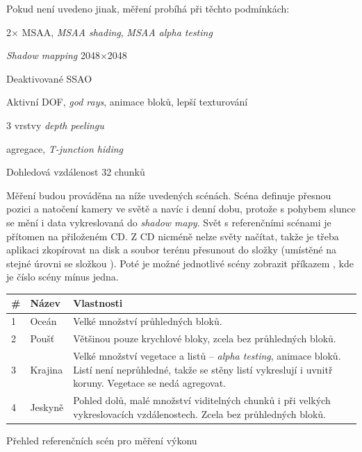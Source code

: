 \noindent Pokud není uvedeno jinak, měření probíhá při těchto podmínkách:
\begin{compactitem}
	\item 2× MSAA, \textit{MSAA shading}, \textit{MSAA alpha testing}
	\item \textit{Shadow mapping} 2048×2048
	\item Deaktivované SSAO
	\item Aktivní DOF, \textit{god rays}, animace bloků, lepší texturování
	\item 3 vrstvy \textit{depth peelingu}
	\item {} agregace, \textit{T-junction hiding}
	\item Dohledová vzdálenost 32 chunků
\end{compactitem}
\vspace{3mm}

\noindent Měření budou prováděna na níže uvedených scénách. Scéna definuje přesnou pozici a natočení kamery ve světě a navíc i denní dobu, protože s pohybem slunce se mění i data vykreslovaná do \textit{shadow mapy}. Svět s referenčními scénami je přítomen na přiloženém CD. Z CD nicméně nelze světy načítat, takže je třeba aplikaci zkopírovat na disk a soubor terénu  přesunout do složky  (umístěné na stejné úrovni se složkou ). Poté je možné jednotlivé scény zobrazit příkazem , kde  je číslo scény mínus jedna.

\begin{tableFloat}[H]
	\centering
	\def\arraystretch{1.5}
	\begin{tabular}{l l L{12cm}}
		\textbf{\#} & \textbf{Název} & \textbf{Vlastnosti} \\  & Oceán & Velké množství průhledných bloků. \\
		2 & Poušť & Většinou pouze krychlové bloky, zcela bez průhledných bloků. \\
		3 & Krajina & Velké množství vegetace a listů -- \textit{alpha testing}, animace bloků. Listí není neprůhledné, takže se stěny listí vykreslují i uvnitř koruny. Vegetace se nedá agregovat. \\
		4 & Jeskyně & Pohled dolů, malé množství viditelných chunků i při velkých vykreslovacích vzdálenostech. Zcela bez průhledných bloků. \\
	\end{tabular}
	\caption{Přehled referenčních scén pro měření výkonu}
\end{tableFloat}

